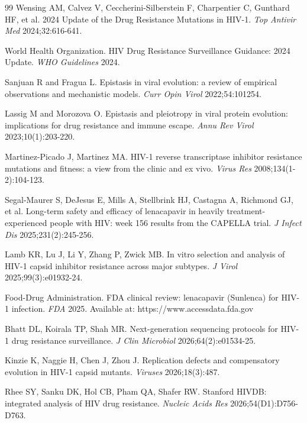 \documentclass[12pt,a4paper]{article}
\begin{document}
\begin{thebibliography}{99}
 Wensing AM, Calvez V, Ceccherini-Silberstein F, Charpentier C, Gunthard HF, et al. 2024 Update of the Drug Resistance Mutations in HIV-1. \textit{Top Antivir Med} 2024;32:616-641.

 World Health Organization. HIV Drug Resistance Surveillance Guidance: 2024 Update. \textit{WHO Guidelines} 2024.

 Sanjuan R and Fragua L. Epistasis in viral evolution: a review of empirical observations and mechanistic models. \textit{Curr Opin Virol} 2022;54:101254.

 Lassig M and Morozova O. Epistasis and pleiotropy in viral protein evolution: implications for drug resistance and immune escape. \textit{Annu Rev Virol} 2023;10(1):203-220.

 Martinez-Picado J, Martinez MA. HIV-1 reverse transcriptase inhibitor resistance mutations and fitness: a view from the clinic and ex vivo. \textit{Virus Res} 2008;134(1-2):104-123.

 Segal-Maurer S, DeJesus E, Mills A, Stellbrink HJ, Castagna A, Richmond GJ, et al. Long-term safety and efficacy of lenacapavir in heavily treatment-experienced people with HIV: week 156 results from the CAPELLA trial. \textit{J Infect Dis} 2025;231(2):245-256.

 Lamb KR, Lu J, Li Y, Zhang P, Zwick MB. In vitro selection and analysis of HIV-1 capsid inhibitor resistance across major subtypes. \textit{J Virol} 2025;99(3):e01932-24.

 Food-Drug Administration. FDA clinical review: lenacapavir (Sunlenca) for HIV-1 infection. \textit{FDA} 2025. Available at: https://www.accessdata.fda.gov

 Bhatt DL, Koirala TP, Shah MR. Next-generation sequencing protocols for HIV-1 drug resistance surveillance. \textit{J Clin Microbiol} 2026;64(2):e01534-25.

 Kinzie K, Naggie H, Chen J, Zhou J. Replication defects and compensatory evolution in HIV-1 capsid mutants. \textit{Viruses} 2026;18(3):487.

 Rhee SY, Sanku DK, Hol CB, Pham QA, Shafer RW. Stanford HIVDB: integrated analysis of HIV drug resistance. \textit{Nucleic Acids Res} 2026;54(D1):D756-D763.

\end{thebibliography}
\end{document}

